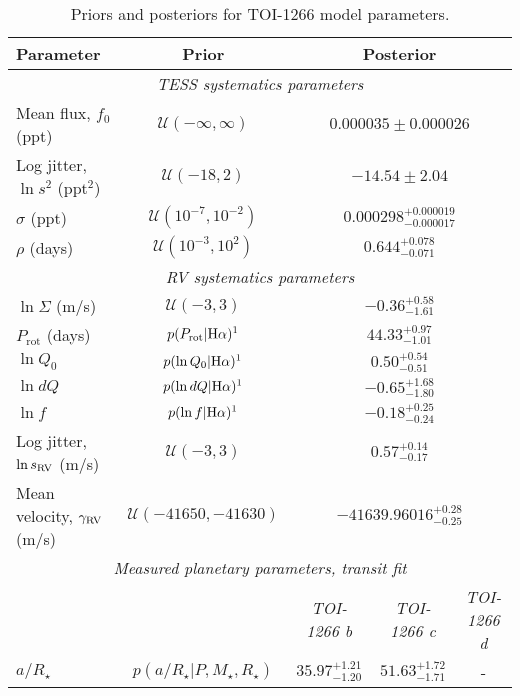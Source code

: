 \begin{table*}
  \centering
  \caption{Priors and posteriors for TOI-1266 model parameters.\label{tab:results}}
  \begin{tabular}{lcccc}
    \hline
    \hline
    Parameter & Prior & \multicolumn{3}{c}{Posterior} \\
    \hline
    \multicolumn{5}{c}{\emph{TESS systematics parameters}} \\
    \hline
    Mean flux, $f_{0}$ (ppt) & $\mathcal{U}(-\infty,\infty)$ & \multicolumn{3}{c}{$0.000035\pm 0.000026$} \\
    Log jitter, $\ln{s^2}$ (ppt$^2$) & $\mathcal{U}(-18,2)$ & \multicolumn{3}{c}{$-14.54\pm 2.04$} \\
    $\sigma$ (ppt) & $\mathcal{U}(10^{-7},10^{-2})$ & \multicolumn{3}{c}{$0.000298^{+0.000019}_{-0.000017}$} \\
    $\rho$ (days) & $\mathcal{U}(10^{-3},10^{2})$ & \multicolumn{3}{c}{$0.644^{+0.078}_{-0.071}$} \\
    \multicolumn{5}{c}{\emph{RV systematics parameters}} \\
    \hline
    $\ln{\Sigma}$ (m/s) & $\mathcal{U}(-3,3)$ & \multicolumn{3}{c}{$-0.36^{+0.58}_{-1.61}$} \\
    $P_{\text{rot}}$ (days) & $p(P_{\text{rot}}\vert \mathrm{H}\alpha)^\textsc{1}$ & \multicolumn{3}{c}{$44.33^{+0.97}_{-1.01}$} \\
    $\ln{Q_0}$ & $p(\ln{Q_0}\vert \mathrm{H}\alpha)^\textsc{1}$ & \multicolumn{3}{c}{$0.50^{+0.54}_{-0.51}$} \\
    $\ln{dQ}$ & $p(\ln{dQ}\vert \mathrm{H}\alpha)^\textsc{1}$ & \multicolumn{3}{c}{$-0.65^{+1.68}_{-1.80}$} \\
    $\ln{f}$ & $p(\ln{f}\vert \mathrm{H}\alpha)^\textsc{1}$ & \multicolumn{3}{c}{$-0.18^{+0.25}_{-0.24}$} \\
    Log jitter, $\ln{s}_{\rm RV}$ (m/s) & $\mathcal{U}(-3,3)$ & \multicolumn{3}{c}{$0.57^{+0.14}_{-0.17}$} \\
    Mean velocity, $\gamma_{\rm RV}$ (m/s) & $\mathcal{U}(-41650,-41630)$ & \multicolumn{3}{c}{$-41639.96016^{+0.28}_{-0.25}$} \\    
    \multicolumn{5}{c}{\emph{Measured planetary parameters, transit fit}} \\
    \hline
    && \emph{TOI-1266 b} & \emph{TOI-1266 c} & \emph{TOI-1266 d} \\
    $a/R_\star$ & $p(a/R_\star\vert P,M_{\star}, R_{\star})$ & $35.97^{+1.21}_{-1.20}$ & $51.63^{+1.72}_{-1.71}$ & - \\

\end{tabular}
\end{table*}
